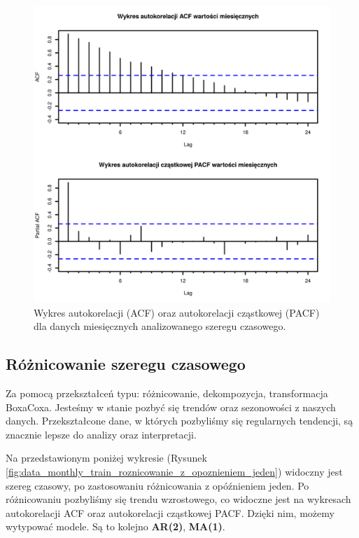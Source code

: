 \documentclass[11pt]{article}
\begin{document}
\begin{figure}[h]

    \centering
	\includegraphics[width=\textwidth]{images/data_monthly_train_wykres_autokorelacji_oraz_czastkowej.png}
    \caption{Wykres autokorelacji (ACF) oraz autokorelacji cząstkowej (PACF) dla danych miesięcznych analizowanego szeregu czasowego.}
    \label{fig:data_monthly_train_wykres_autokorelacji_oraz_czastkowej}

\end{figure}

\newpage

\subsection{Różnicowanie szeregu czasowego}

Za pomocą przekształceń typu: różnicowanie, dekompozycja, transformacja BoxaCoxa. Jesteśmy w stanie pozbyć się trendów oraz sezonowości z naszych danych. Przekształcone dane, w których pozbyliśmy się regularnych tendencji, są znacznie lepsze do analizy oraz interpretacji.

Na przedstawionym poniżej wykresie (Rysunek \ref{fig:data_monthly_train_roznicowanie_z_opoznieniem_jeden}) widoczny jest szereg czasowy, po zastosowaniu różnicowania z opóźnieniem jeden. Po różnicowaniu pozbyliśmy się trendu wzrostowego, co widoczne jest na wykresach autokorelacji ACF oraz autokorelacji cząstkowej PACF. Dzięki nim, możemy wytypować modele. Są to kolejno \textbf{AR(2)}, \textbf{MA(1)}.
\end{document}
